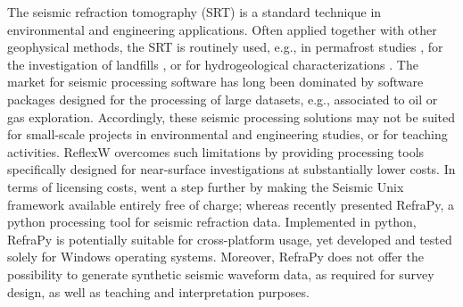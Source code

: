 \documentclass[a4paper,fleqn]{cas-sc}
\begin{document}
The seismic refraction tomography (SRT) is a standard technique in environmental and engineering applications. Often applied together with other geophysical methods, the SRT is routinely used, e.g., in 
permafrost studies \citep[e.g.,][]{draebing2016, steiner2021}, for the investigation of landfills \citep[e.g.,][]{nguyen2018, steiner2022}, or for hydrogeological characterizations \citep[e.g.,][]{buecker2021}. 
The market for seismic processing software has long been dominated by software packages designed for the processing of large datasets, e.g., associated to oil or gas exploration. 
Accordingly, these seismic processing solutions may not be suited for small-scale projects in environmental and engineering studies, or for teaching activities. 
ReflexW overcomes such limitations by providing processing tools specifically designed for near-surface investigations at substantially lower costs. In terms of licensing costs, 
\citet{stockwell1999} went a step further by making the Seismic Unix framework available entirely free of charge; whereas \citet{guedes2022} recently presented RefraPy, a python processing tool for seismic refraction data. 
Implemented in python, RefraPy is potentially suitable for cross-platform usage, yet 
\citet{guedes2022} 
developed and tested 
solely for Windows operating systems. Moreover, RefraPy does not offer the possibility to generate synthetic seismic waveform data, as required for survey design, as well as teaching and interpretation purposes.
\end{document}
